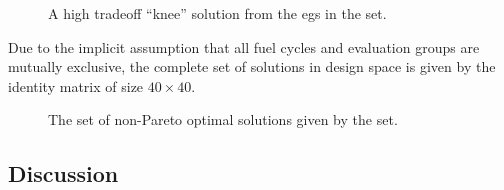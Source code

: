 \begin{figure}[htbp!]
  \centering
  \resizebox{0.8\columnwidth}{!}{}
  \caption{A high tradeoff ``knee'' solution from the \acp{eg} in the \ac{set}.}
  \label{fig:single-eg-set-space}
\end{figure}

Due to the implicit assumption that all fuel cycles and evaluation groups are mutually exclusive,
the complete set of solutions in design space is given by the identity matrix of size $40 \times 40$.

\begin{figure}[htbp!]
  \centering
  \resizebox{0.8\columnwidth}{!}{}
  \caption{The set of non-Pareto optimal solutions given by the \ac{set}.}
  \label{fig:non-optimal-eg-set-space}
\end{figure}

\subsection{Discussion}
